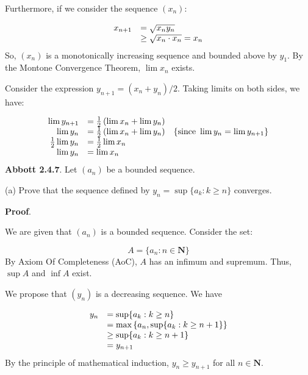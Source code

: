 \documentclass[10pt]{article}
\begin{document}
Furthermore, if we consider the sequence $\displaystyle ( x_{n})$:


\begin{equation*}
\begin{array}{ c l }
x_{n+1} & =\sqrt{x_{n} y_{n}}\\
 & \geq \sqrt{x_{n} \cdot x_{n}} =x_{n}
\end{array}
\end{equation*}
So, $\displaystyle ( x_{n})$ is a monotonically increasing sequence and bounded above by $\displaystyle y_{1}$. By the Montone Convergence Theorem, $\displaystyle \lim x_{n}$ exists.



Consider the expression $\displaystyle y_{n+1} =( x_{n} +y_{n}) /2$. Taking limits on both sides, we have:


\begin{equation*}
\begin{array}{ r l c }
\lim y_{n+1} & =\frac{1}{2}\left(\lim x_{n} +\lim y_{n}\right) & \\
\lim y_{n} & =\frac{1}{2}\left(\lim x_{n} +\lim y_{n}\right) & \left\{\text{since} \ \lim y_{n} =\lim y_{n+1}\right\}\\
\frac{1}{2}\lim y_{n} & =\frac{1}{2}\lim x_{n} & \\
\lim y_{n} & =\lim x_{n} & 
\end{array}
\end{equation*}
\textbf{Abbott 2.4.7}. Let $\displaystyle ( a_{n})$ be a bounded sequence. 



(a) Prove that the sequence defined by $\displaystyle y_{n} =\sup \{a_{k} :k\geq n\}$ converges. 



\textbf{Proof}.

We are given that $\displaystyle ( a_{n})$ is a bounded sequence. Consider the set:


\begin{equation*}
A=\{a_{n} :n\in \mathbf{N}\}
\end{equation*}
By Axiom Of Completeness (AoC), $\displaystyle A$ has an infimum and supremum. Thus, $\displaystyle \sup A$ and $\displaystyle \inf A$ exist. 



We propose that $\displaystyle ( y_{n})$ is a decreasing sequence. We have


\begin{equation*}
\begin{array}{ c l }
y_{n} & =\sup \{a_{k} :k\geq n\}\\
 & =\max\left\{a_{n} ,\sup \{a_{k} :k\geq n+1\}\right\}\\
 & \geq \sup \{a_{k} :k\geq n+1\}\\
 & =y_{n+1}
\end{array}
\end{equation*}
By the principle of mathematical induction, $\displaystyle y_{n} \geq y_{n+1}$ for all $\displaystyle n\in \mathbf{N}$.
\end{document}

